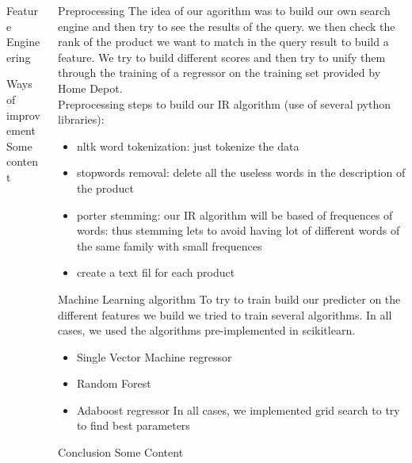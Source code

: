 \documentclass{beamer}
\newlength\postercolumnwidth
\newlength\totalwidth
\begin{document}
\begin{frame}[t]{}
\begin{columns}[totalwidth=\totalwidth]
\begin{column}[t]{\postercolumnwidth}
\begin{block}{Feature Engineering}
    \end{block}
  \begin{block}{Ways of improvement}
    Some content
    \end{block}
  \end{column}
  \begin{column}[t]{\postercolumnwidth}
    \centering
     \begin{block}{Preprocessing}
 \small
The idea of our agorithm was to build our own search engine and then try to see the results of the query. we then check the rank of the product we want to match in the query result to build a feature. We try to build different scores and then try to unify them through the training of a regressor on the training set provided by Home Depot. 
\\Preprocessing steps to build our IR algorithm (use of several python libraries): 
\begin{itemize}
\item nltk word tokenization: just tokenize the data
\item stopwords removal: delete all the useless words in the description of the product
\item porter stemming: our IR algorithm will be based of frequences of words: thus stemming lets to avoid having lot of different words of the same family with small frequences
\item create a text fil for each product
\end{itemize}
   
    \end{block}


    \begin{block}{Machine Learning algorithm}
\small
To try to train build our predicter on the different features we build we tried to train several algorithms. In all cases, we used the algorithms pre-implemented in scikitlearn.  
\begin{itemize}
\item Single Vector Machine regressor
\item Random Forest 
\item Adaboost regressor
In all cases, we implemented grid search to try to find best parameters


\end{itemize}


    \end{block} 

    \begin{block}{Conclusion}
      Some Content
    \end{block}
  \end{column}
 \end{columns}

\end{frame}
\end{document}
